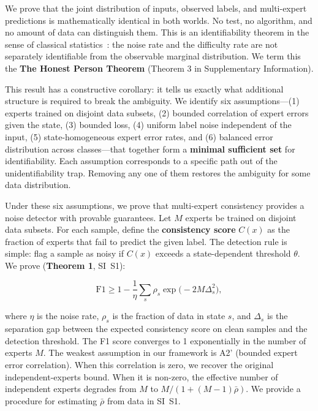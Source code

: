 \documentclass[12pt,a4paper]{article}
\theoremstyle{definition}
\theoremstyle{plain}
\theoremstyle{remark}
\begin{document}
We prove that the joint distribution of inputs, observed labels, and multi-expert predictions is mathematically identical in both worlds. No test, no algorithm, and no amount of data can distinguish them. This is an identifiability theorem in the sense of classical statistics~\cite{casella2002}: the noise rate and the difficulty rate are not separately identifiable from the observable marginal distribution. We term this the \textbf{The Honest Person Theorem} (Theorem 3 in Supplementary Information).

This result has a constructive corollary: it tells us exactly what additional structure is required to break the ambiguity. We identify six assumptions---(1) experts trained on disjoint data subsets, (2) bounded correlation of expert errors given the state, (3) bounded loss, (4) uniform label noise independent of the input, (5) state-homogeneous expert error rates, and (6) balanced error distribution across classes---that together form a \textbf{minimal sufficient set} for identifiability. Each assumption corresponds to a specific path out of the unidentifiability trap. Removing any one of them restores the ambiguity for some data distribution.

Under these six assumptions, we prove that multi-expert consistency provides a noise detector with provable guarantees. Let $M$ experts be trained on disjoint data subsets. For each sample, define the \textbf{consistency score} $C(x)$ as the fraction of experts that fail to predict the given label. The detection rule is simple: flag a sample as noisy if $C(x)$ exceeds a state-dependent threshold $\theta$. We prove (\textbf{Theorem 1}, SI~S1):

\begin{equation}
\mathrm{F1} \geq 1 - \frac{1}{\eta}\sum_{s} \rho_s \exp\bigl(-2M\Delta_s^2\bigr),
\end{equation}

where $\eta$ is the noise rate, $\rho_s$ is the fraction of data in state $s$, and $\Delta_s$ is the separation gap between the expected consistency score on clean samples and the detection threshold. The F1 score converges to 1 exponentially in the number of experts $M$. The weakest assumption in our framework is A2' (bounded expert error correlation). When this correlation is zero, we recover the original independent-experts bound. When it is non-zero, the effective number of independent experts degrades from $M$ to $M/(1+(M-1)\bar{\rho})$. We provide a procedure for estimating $\bar{\rho}$ from data in SI~S1.
\end{document}
